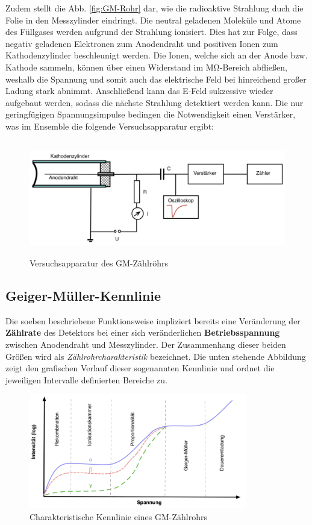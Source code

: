 \noindent Zudem stellt die Abb. \ref{fig:GM-Rohr} dar, wie die radioaktive Strahlung duch die Folie in den Messzylinder 
eindringt. Die neutral geladenen Moleküle und Atome des Füllgases werden aufgrund der Strahlung ionisiert. Dies hat zur 
Folge, dass negativ geladenen Elektronen zum Anodendraht und positiven Ionen zum Kathodenzylinder beschleunigt werden.
Die Ionen, welche sich an der Anode bzw. Kathode sammeln, können über einen Widerstand im $\unit{\mega\ohm}$-Bereich 
abfließen, weshalb die Spannung und somit auch das elektrische Feld bei hinreichend großer Ladung stark abnimmt. 
Anschließend kann das E-Feld sukzessive wieder aufgebaut werden, sodass die nächste Strahlung detektiert werden kann.
Die nur geringfügigen Spannungsimpulse bedingen die Notwendigkeit einen Verstärker, was im Ensemble die folgende 
Versuchsapparatur ergibt:

\begin{figure}[H]
    \centering 
    \includegraphics[height=5cm]{content/Apparatur.png}
    \caption{Versuchsapparatur des GM-Zählröhrs\cite{Versuchsanleitung_v703}}
    \label{fig:GM-Apparatur}
\end{figure}

\subsection{Geiger-Müller-Kennlinie}

\noindent Die soeben beschriebene Funktionsweise impliziert bereits eine Veränderung der \textbf{Zählrate} des Detektors bei 
einer sich veränderlichen \textbf{Betriebsspannung} zwischen Anodendraht und Messzylinder. Der Zusammenhang dieser beiden 
Größen wird als \emph{Zählrohrcharakteristik} bezeichnet. Die unten stehende Abbildung zeigt den grafischen Verlauf 
dieser sogenannten Kennlinie und ordnet die jeweiligen Intervalle definierten Bereiche zu.

\begin{figure}[H]
    \centering 
    \includegraphics[height=5cm]{content/Kennlinie.png}
    \caption{Charakteristische Kennlinie eines GM-Zählrohrs\cite{KennlinieGM}}
    \label{fig:Kennlinie}
\end{figure}

